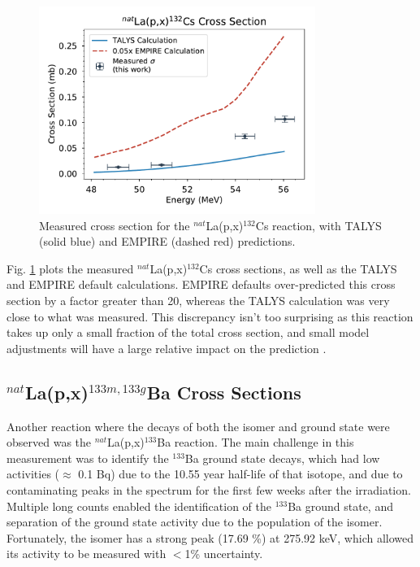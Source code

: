 \documentclass[aps,twocolumn,secnumarabic,balancelastpage,amsmath,amssymb,nofootinbib,floatfix]{revtex4-1}
\begin{document}
\begin{figure}[htb]
\includegraphics[width=9cm]{cross_sections/132CS}
\caption{Measured cross section for the $^{nat}$La(p,x)$^{132}$Cs reaction, with TALYS (solid blue) and EMPIRE (dashed red) predictions.
}
\label{fig:132CS}
\end{figure}

Fig. \ref{fig:132CS} plots the measured $^{nat}$La(p,x)$^{132}$Cs cross sections, as well as the TALYS and EMPIRE default calculations.  EMPIRE defaults over-predicted this cross section by a factor greater than 20, whereas the TALYS calculation was very close to what was measured.  This discrepancy isn't too surprising as this reaction takes up only a small fraction of the total cross section, and small model adjustments will have a large relative impact on the prediction \cite{KONING2003231}.

\subsection{$^{nat}$La(p,x)$^{133m,133g}$Ba Cross Sections}

Another reaction where the decays of both the isomer and ground state were observed was the $^{nat}$La(p,x)$^{133}$Ba reaction.  The main challenge in this measurement was to identify the $^{133}$Ba ground state decays, which had low activities ($\approx$ 0.1 Bq) due to the 10.55 year half-life of that isotope, and due to contaminating peaks in the spectrum for the first few weeks after the irradiation.  Multiple long counts enabled the identification of the $^{133}$Ba ground state, and separation of the ground state activity due to the population of the isomer.  Fortunately, the isomer has a strong peak (17.69 \%) at 275.92 keV, which allowed its activity to be measured with $<$1\% uncertainty.
\end{document}
